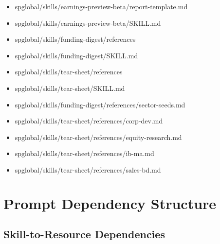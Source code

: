 \documentclass[11pt]{article}
\begin{document}
\begin{itemize}[leftmargin=*,itemsep=1pt,topsep=2pt]
\item \hspace*{2.7em}spglobal/skills/earnings-preview-beta/report-template.md
\item \hspace*{2.7em}spglobal/skills/earnings-preview-beta/SKILL.md
\item \hspace*{2.7em}spglobal/skills/funding-digest/references
\item \hspace*{2.7em}spglobal/skills/funding-digest/SKILL.md
\item \hspace*{2.7em}spglobal/skills/tear-sheet/references
\item \hspace*{2.7em}spglobal/skills/tear-sheet/SKILL.md
\item \hspace*{3.6em}spglobal/skills/funding-digest/references/sector-seeds.md
\item \hspace*{3.6em}spglobal/skills/tear-sheet/references/corp-dev.md
\item \hspace*{3.6em}spglobal/skills/tear-sheet/references/equity-research.md
\item \hspace*{3.6em}spglobal/skills/tear-sheet/references/ib-ma.md
\item \hspace*{3.6em}spglobal/skills/tear-sheet/references/sales-bd.md
\end{itemize}

\section{Prompt Dependency Structure}

\subsection{Skill-to-Resource Dependencies}
\end{document}
